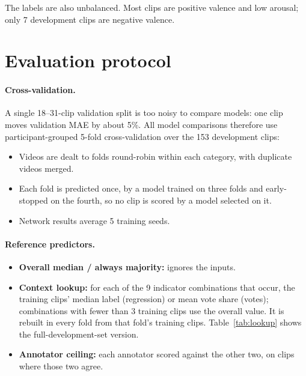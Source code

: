 \documentclass[11pt]{article}
\begin{document}
The labels are also unbalanced. Most clips are positive valence and low arousal; only 7 development clips are negative valence.

\section{Evaluation protocol}\label{sec:eval}

\paragraph{Cross-validation.} A single 18--31-clip validation split is too noisy to compare models: one clip moves validation MAE by about 5\%. All model comparisons therefore use participant-grouped 5-fold cross-validation over the 153 development clips:
\begin{itemize}
  \item Videos are dealt to folds round-robin within each category, with duplicate videos merged.
  \item Each fold is predicted once, by a model trained on three folds and early-stopped on the fourth, so no clip is scored by a model selected on it.
  \item Network results average 5 training seeds.
\end{itemize}

\paragraph{Reference predictors.}
\begin{itemize}
  \item \textbf{Overall median / always majority:} ignores the inputs.
  \item \textbf{Context lookup:} for each of the 9 indicator combinations that occur, the training clips' median label (regression) or mean vote share (votes); combinations with fewer than 3 training clips use the overall value. It is rebuilt in every fold from that fold's training clips. Table~\ref{tab:lookup} shows the full-development-set version.
  \item \textbf{Annotator ceiling:} each annotator scored against the other two, on clips where those two agree.
\end{itemize}
\end{document}
